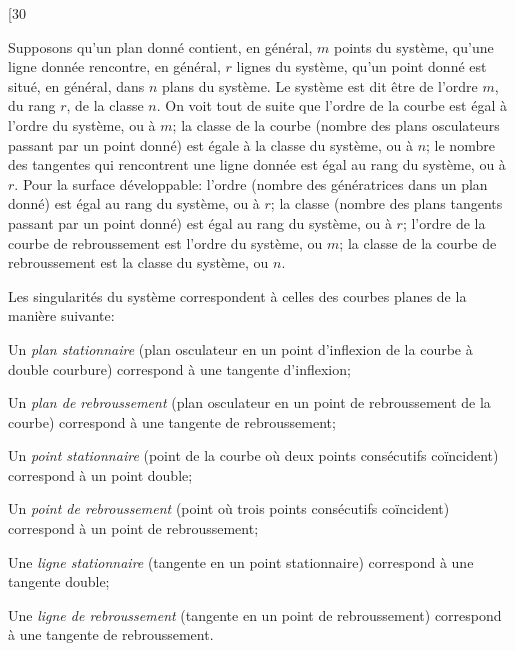 \documentclass[11pt,a4paper]{article}
\begin{document}
\newpage
\setcounter{page}{208}

\begin{center}
{\small [30}
\end{center}
\vspace{-1em}

Supposons qu'un plan donn\'{e} contient, en g\'{e}n\'{e}ral, $m$ points du syst\`{e}me, qu'une ligne
donn\'{e}e rencontre, en g\'{e}n\'{e}ral, $r$ lignes du syst\`{e}me, qu'un point donn\'{e} est situ\'{e}, en
g\'{e}n\'{e}ral, dans $n$ plans du syst\`{e}me. Le syst\`{e}me est dit \^{e}tre de l'ordre $m$, du rang $r$,
de la classe $n$. On voit tout de suite que l'ordre de la courbe est \'{e}gal \`{a} l'ordre du
syst\`{e}me, ou \`{a} $m$; la classe de la courbe (nombre des plans osculateurs passant par
un point donn\'{e}) est \'{e}gale \`{a} la classe du syst\`{e}me, ou \`{a} $n$; le nombre des tangentes qui
rencontrent une ligne donn\'{e}e est \'{e}gal au rang du syst\`{e}me, ou \`{a} $r$. Pour la surface
d\'{e}veloppable: l'ordre (nombre des g\'{e}n\'{e}ratrices dans un plan donn\'{e}) est \'{e}gal au rang du
syst\`{e}me, ou \`{a} $r$; la classe (nombre des plans tangents passant par un point donn\'{e}) est
\'{e}gal au rang du syst\`{e}me, ou \`{a} $r$; l'ordre de la courbe de rebroussement est l'ordre du
syst\`{e}me, ou $m$; la classe de la courbe de rebroussement est la classe du syst\`{e}me, ou $n$.

\newpage
\setcounter{page}{209}

Les singularit\'{e}s du syst\`{e}me correspondent \`{a} celles des courbes planes de la mani\`{e}re
suivante:

Un \textit{plan stationnaire} (plan osculateur en un point d'inflexion de la courbe \`{a} double
courbure) correspond \`{a} une tangente d'inflexion;

Un \textit{plan de rebroussement} (plan osculateur en un point de rebroussement de la courbe)
correspond \`{a} une tangente de rebroussement;

Un \textit{point stationnaire} (point de la courbe o\`{u} deux points cons\'{e}cutifs co\"{i}ncident)
correspond \`{a} un point double;

Un \textit{point de rebroussement} (point o\`{u} trois points cons\'{e}cutifs co\"{i}ncident) correspond
\`{a} un point de rebroussement;

Une \textit{ligne stationnaire} (tangente en un point stationnaire) correspond \`{a} une tangente
double;

Une \textit{ligne de rebroussement} (tangente en un point de rebroussement) correspond \`{a}
une tangente de rebroussement.
\end{document}
